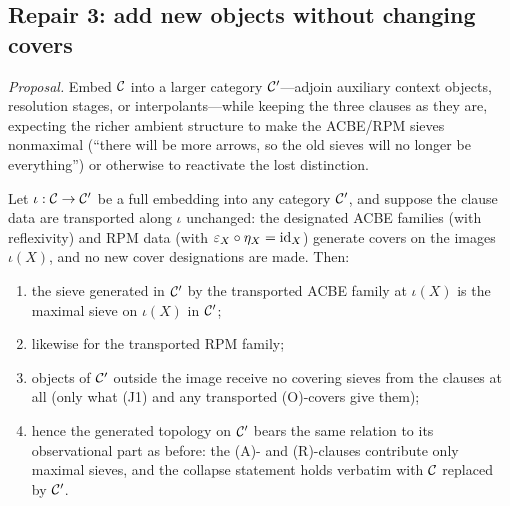 \subsection{Repair 3: add new objects without changing covers}
\label{ch05:sub:repair3}

\emph{Proposal.} Embed $\mathcal{C}$ into a larger category $\mathcal{C}'$---adjoin
auxiliary context objects, resolution stages, or interpolants---while
keeping the three clauses as they are, expecting the richer ambient
structure to make the ACBE/RPM sieves nonmaximal (``there will be more
arrows, so the old sieves will no longer be everything'') or otherwise to
reactivate the lost distinction.

\begin{proposition}
\label{ch05:prop:repair3}
Let $\iota:\mathcal{C}\to\mathcal{C}'$ be a full embedding into any category $\mathcal{C}'$, and
suppose the clause data are transported along $\iota$ unchanged: the
designated ACBE families (with reflexivity) and RPM data (with
$\varepsilon_X\circ\eta_X=\mathrm{id}_X$) generate covers on the images
$\iota(X)$, and no new cover designations are made. Then:
\begin{enumerate}
\item the sieve generated in $\mathcal{C}'$ by the transported ACBE family at
$\iota(X)$ is the maximal sieve on $\iota(X)$ in $\mathcal{C}'$;
\item likewise for the transported RPM family;
\item objects of $\mathcal{C}'$ outside the image receive no covering sieves from
the clauses at all (only what (J1) and any transported (O)-covers give
them);
\item hence the generated topology on $\mathcal{C}'$ bears the same relation to its
observational part as before: the (A)- and (R)-clauses contribute only
maximal sieves, and the collapse statement holds verbatim with $\mathcal{C}$
replaced by $\mathcal{C}'$.
\end{enumerate}
\end{proposition}

